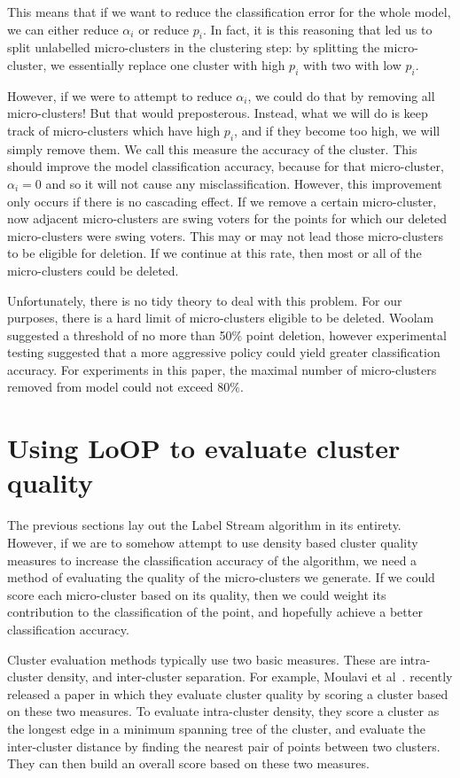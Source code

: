 \documentclass[12pt,a4paper,oneside]{report}
\begin{document}
This means that if we want to reduce the classification error for the whole model, we can either reduce $\alpha_i$ or reduce $p_i$. In fact, it is this reasoning that led us to split unlabelled micro-clusters in the clustering step: by splitting the micro-cluster, we essentially replace one cluster with high $p_i$ with two with low $p_i$. 

However, if we were to attempt to reduce $\alpha_i$, we could do that by removing all micro-clusters! But that would preposterous. Instead, what we will do is keep track of micro-clusters which have high $p_i$, and if they become too high, we will simply remove them. We call this measure the accuracy of the cluster. This should improve the model classification accuracy, because for that micro-cluster, $\alpha_i = 0$ and so it will not cause any misclassification. However, this improvement only occurs if there is no cascading effect. If we remove a certain micro-cluster, now adjacent micro-clusters are swing voters for the points for which our deleted micro-clusters were swing voters. This may or may not lead those micro-clusters to be eligible for deletion. If we continue at this rate, then most or all of the micro-clusters could be deleted. 

Unfortunately, there is no tidy theory to deal with this problem. For our purposes, there is a hard limit of micro-clusters eligible to be deleted. Woolam suggested a threshold of no more than 50$\%$ point deletion, however experimental testing suggested that a more aggressive policy could yield greater classification accuracy. For experiments in this paper, the maximal number of micro-clusters removed from model could not exceed 80$\%$.

\section*{Using LoOP to evaluate cluster quality}

The previous sections lay out the Label Stream algorithm in its entirety. However, if we are to somehow attempt to use density based cluster quality measures to increase the classification accuracy of the algorithm, we need a method of evaluating the quality of the micro-clusters we generate. If we could score each micro-cluster based on its quality, then we could weight its contribution to the classification of the point, and hopefully achieve a better classification accuracy. 

Cluster evaluation methods typically use two basic measures. These are intra-cluster density, and inter-cluster separation. For example, Moulavi et al~\cite{DBCV}. recently released a paper in which they evaluate cluster quality by scoring a cluster based on these two measures. To evaluate intra-cluster density, they score a cluster as the longest edge in a minimum spanning tree of the cluster, and evaluate the inter-cluster distance by finding the nearest pair of points between two clusters. They can then build an overall score based on these two measures. 
\end{document}
